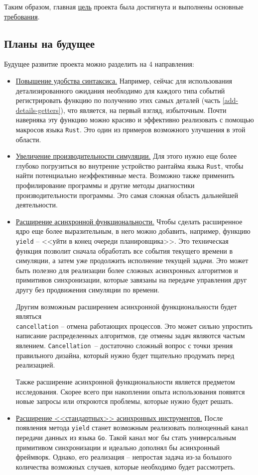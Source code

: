 Таким образом, главная \hyperref[main-purpose]{цель} проекта была достигнута и выполнены основные \hyperref[requirements]{требования}. 

\subsection{Планы на будущее} \label{future-plans}
Будущее развитие проекта можно разделить на 4 направления: 
\begin{itemize}
    \item \underline{Повышение удобства синтаксиса.} Например, сейчас для использования детализированного ожидания необходимо для каждого типа событий регистрировать функцию по получению этих самых деталей (часть \ref{add-details-getters}), что является, на первый взгляд, избыточным. Почти наверняка эту функцию можно красиво и эффективно реализовать с помощью макросов языка \texttt{Rust}. Это один из примеров возможного улучшения в этой области. 
    \item \underline{Увеличение производительности симуляции.} Для этого нужно еще более глубоко погрузиться во внутренне устройство рантайма языка \texttt{Rust}, чтобы найти потенциально неэффективные места. Возможно также применить профилирование программы и другие методы диагностики производительности программы. Это самая сложная область дальнейшей деятельности. 
    \item \underline{Расширение асинхронной функциональности.} Чтобы сделать расширенное ядро еще более выразительным, в него можно добавить, например, функцию \texttt{yield} -- <<уйти в конец очереди планировщика>>. Это техническая функция позволит сначала обработать все события текущего времени в симуляции, а затем уже продолжить исполнение текущей задачи. Это может быть полезно для реализации более сложных асинхронных алгоритмов и примитивов синхронизации, которые завязаны на передаче управления друг другу без продвижения симуляции по времени. 
    
    Другим возможным расширением асинхронной функциональности будет являться \\ \texttt{cancellation} -- отмена работающих процессов. Это может сильно упростить написание распределенных алгоритмов, где отмены задач являются частым явлением. \texttt{Cancellation}~-- достаточно сложный вопрос с точки зрения правильного дизайна, который нужно будет тщательно продумать перед реализацией.
    
    Также расширение асинхронной функциональности является предметом исследования. Скорее всего при накоплении опыта использования появятся новые запросы или откроются проблемы, которые нужно будет решать.
    \item \underline{Расширение <<стандартных>> асинхронных инструментов.} После появления метода \texttt{yield} станет возможным реализовать полноценный канал передачи данных из языка \texttt{Go}. Такой канал мог бы стать универсальным примитивом синхронизации и  идеально дополнял бы асинхронный фреймворк. Однако, его реализация -- непростая задача из-за большого количества возможных случаев, которые необходимо будет рассмотреть.  
    

\end{itemize}
